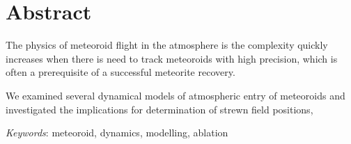 \section*{Abstract}
    The physics of meteoroid flight in the atmosphere is 
    the complexity quickly increases when there is need to track meteoroids
    with high precision, which is often a prerequisite of a successful
    meteorite recovery.

    We examined several dynamical models of atmospheric entry of meteoroids
    and investigated the implications for determination of strewn field positions,

    \emph{Keywords}: meteoroid, dynamics, modelling, ablation
